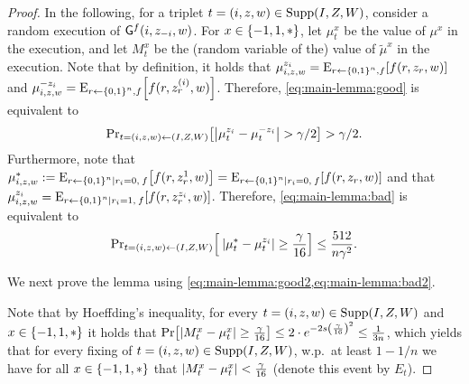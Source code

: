 {\begin{proof}
	In the following, for a triplet $t = (i,z,w) \in \operatorname{Supp}(I,Z,W)$, consider a random execution of $\mathsf{G}^f(i,z_{-i},w)$. For $x \in \set{-1,1,*}$, let $\mu^x_t$ be the value of $\mu^x$ in the execution, and let $M^x_t$ be the (random variable of the) value of $\tilde{\mu}^x$ in the execution. Note that by definition, it holds that $\mu_{i,z,w}^{z_i} = \eex{r \la \zo^n, f}{f(r,z_{r},w)}$ and $\mu_{i,z,w}^{-z_i} = \eex{r \la \zo^n, f}{f(r,z^{(i)}_{r},w)}$. Therefore, \cref{eq:main-lemma:good} is equivalent to 
	\begin{align}\label{eq:main-lemma:good2}
		\ppr{t=(i,z,w) \la (I,Z,W)}{\size{\mu_t^{z_i} - \mu_t^{-z_i}} > \gamma/2} > \gamma/2.
	\end{align}
	Furthermore, note that $\mu_{i,z,w}^* \eqdef \eex{r \la \zo^n \mid r_i = 0, \: f}{f(r,z^1_{r}, w)} = \eex{r \la \zo^n \mid r_i = 0, \: f}{f(r,z_{r}, w)}$ and that $\mu_{i,z,w}^{z_i} = \eex{r \la \zo^n \mid r_i = 1, \: f}{f(r,z^{z_i}_{r}, w)}$. Therefore, \cref{eq:main-lemma:bad} is equivalent to 
	\begin{align}\label{eq:main-lemma:bad2}
		\ppr{t = (i,z,w) \la (I,Z,W)}{\: \size{\mu_t^* - \mu_t^{z_i}}\geq \frac{\gamma}{16}}  \leq \frac{512}{n \gamma^2}.
	\end{align}
	
	We next prove the lemma using \cref{eq:main-lemma:good2,eq:main-lemma:bad2}.
	
	Note that by Hoeffding's inequality, for every $t = (i,z,w) \in \operatorname{Supp}(I,Z,W)$ and  $x \in \set{-1,1,*}$ it holds that $\pr{\size{M_t^x - \mu_t^x} \geq \frac{\gamma}{16}} \leq 2\cdot e^{-2 s \paren{\frac{\gamma}{16}}^2} \leq \frac1{3n}$, which yields that for every fixing of $t = (i,z,w) \in \operatorname{Supp}(I,Z,W)$, w.p.\ at least $1-1/n$ we have for all $x \in \set{-1,1,*}$ that $\size{M_t^x - \mu_t^x} < \frac{\gamma}{16}$ (denote this event by $E_t$).
	

\end{proof}}
